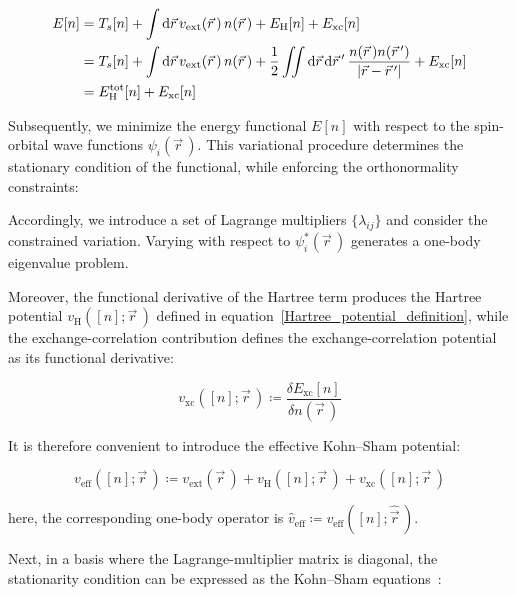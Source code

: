 \begin{equation}
\begin{aligned}
    E[n] &= T_s[n]
    + \int\mathrm{d}\vec{r}\,v_\mathrm{ext}(\vec{r}\,)\,n(\vec{r}\,)
    + E_\mathrm{H}[n] + E_\mathrm{xc}[n] \\
    &= T_s[n]
    + \int\mathrm{d}\vec{r}\,v_\mathrm{ext}(\vec{r}\,)\,n(\vec{r}\,)
    + \frac{1}{2}\iint\mathrm{d}{\vec{r}}\,\mathrm{d}{\vec{r}\,'}\,\frac{n(\vec{r}\,)n(\vec{r}\,')}{|\vec{r}-\vec{r}\,'|}
    + E_\mathrm{xc}[n] \\
    &= E_\mathrm{H}^\mathrm{tot}[n] + E_\mathrm{xc}[n]
\end{aligned}
\end{equation}

Subsequently, we minimize the energy functional $E[n]$ with respect to the spin-orbital wave functions $\psi_i(\vec{r}\,)$.
This variational procedure determines the stationary condition of the functional, while enforcing the orthonormality constraints:

Accordingly, we introduce a set of Lagrange multipliers $\{\lambda_{ij}\}$ and consider the constrained variation.
Varying with respect to $\psi_i^\ast(\vec{r}\,)$ generates a one-body eigenvalue problem.

Moreover, the functional derivative of the Hartree term produces the Hartree potential
$v_\mathrm{H}([n];\vec{r}\,)$ defined in equation~\eqref{Hartree_potential_definition},
while the exchange-correlation contribution defines the exchange-correlation potential as its functional derivative:

\begin{equation}
    v_\mathrm{xc}([n];\vec{r}\,)\coloneqq\frac{\delta E_\mathrm{xc}[n]}{\delta n(\vec{r}\,)}
\label{xc_potential_definition}
\end{equation}

It is therefore convenient to introduce the effective Kohn--Sham potential:

\begin{equation}
    v_\mathrm{eff}([n];\vec{r}\,)
    \coloneqq v_\mathrm{ext}(\vec{r}\,)
    + v_\mathrm{H}([n];\vec{r}\,)
    + v_\mathrm{xc}([n];\vec{r}\,)
\label{KS_effective_potential_definition}
\end{equation}

here, the corresponding one-body operator is $\hat{v}_\mathrm{eff}\coloneqq v_\mathrm{eff}([n];\hat{\vec{r}}\,)$.

Next, in a basis where the Lagrange-multiplier matrix is diagonal,
the stationarity condition can be expressed as the Kohn--Sham equations~\cite{kohn1965self}:

